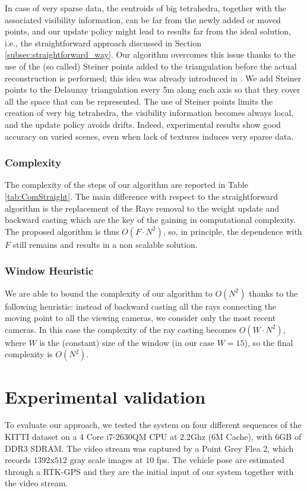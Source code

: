In case of very sparse data, the centroids of big tetrahedra, together with the associated visibility information, can be far from the newly added or moved points, and our update policy might lead to results far from the ideal solution, i.e., the straightforward approach discussed in Section \ref{subsec:straightforward_way}. Our algorithm overcomes this issue thanks to the use of the (so called) Steiner points added to the triangulation before the actual reconstruction is performed; this idea was already introduced in \cite{litvinov_lhuillier_13}.
We add Steiner points to the Delaunay triangulation every 5m along each axis so that they cover all the space that can be represented. The use of Steiner points limits the creation of very big tetrahedra, the visibility information becomes always local, and the update policy avoids drifts. Indeed, experimental results show good accuracy on varied scenes, even when lack of textures induces very sparse data.


\subsubsection{Complexity}
The complexity of the steps of our algorithm are reported in Table \ref{tab:ComStraight}. The main difference with respect to the straightforward algorithm is the replacement of the Rays removal to the weight update and backward casting which are the key of the gaining in computational complexity.
The proposed algorithm is thus $O(F\cdot N^2)$, so, in principle, the dependence with $F$ still remains and results in a non scalable solution. 

\subsubsection{Window Heuristic}
\label{subsub:window}
We are able to bound the complexity of our algorithm to $O(N^2)$ thanks to the following heuristic: instead of backward casting all the rays connecting the moving point to all the viewing cameras, we consider only the most recent cameras.
In this case the complexity of the ray casting becomes  $O(W\cdot N^2)$, where $W$ is the (constant) size  of the window (in our case $W = 15$), so the final complexity is $O(N^2)$.

\section{Experimental validation}
\label{sec:experimental-results}
To evaluate our approach, we tested the system on four different sequences of the KITTI dataset \cite{Geiger_et_al12} on a 4 Core i7-2630QM CPU at 2.2Ghz (6M Cache), with 6GB of DDR3 SDRAM.
The video stream was captured by a Point Grey Flea 2, which records $1392\text{x}512$ gray scale images at $10$ fps. The vehicle pose are estimated through a RTK-GPS and they are the initial input of our system together with the video stream. 

